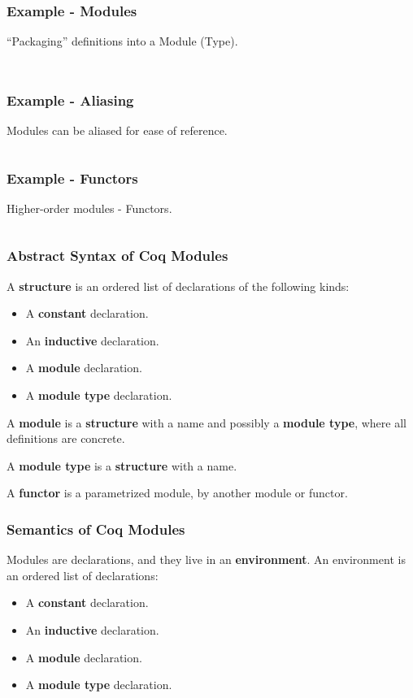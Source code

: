 \begin{frame}
  \frametitle{Example - Modules}
  ``Packaging'' definitions into a Module (Type).
  \inputminted[firstline=11,lastline=16]{coq}{code/module_example.v}
  \inputminted[firstline=19,lastline=23]{coq}{code/module_example.v}
\end{frame}

\begin{frame}
  \frametitle{Example - Aliasing}
  Modules can be aliased for ease of reference.
  \inputminted[firstline=24,lastline=25]{coq}{code/module_example.v}
\end{frame}

\begin{frame}
  \frametitle{Example - Functors}
  Higher-order modules - Functors.
  \inputminted[firstline=27]{coq}{code/module_example.v}
\end{frame}

\begin{frame}
  \frametitle{Abstract Syntax of Coq Modules}
  A \textbf{structure} is an ordered list of declarations of the following
  kinds:
  \begin{itemize}
    \item A \textbf{constant} declaration.
    \item An \textbf{inductive} declaration.
    \item A \textbf{module} declaration.
    \item A \textbf{module type} declaration.
  \end{itemize}\pause
  A \textbf{module} is a \textbf{structure} with a name and possibly a
  \textbf{module type}, where all definitions are concrete.\pause
  
  A \textbf{module type} is a \textbf{structure} with a name.\pause

  A \textbf{functor} is a parametrized module, by another module or functor.
\end{frame}

\begin{frame}
  \frametitle{Semantics of Coq Modules}
  Modules are declarations, and they live in an \textbf{environment}. An
  environment is an ordered list of declarations:
  \begin{itemize}
    \item A \textbf{constant} declaration.
    \item An \textbf{inductive} declaration.
    \item A \textbf{module} declaration.
    \item A \textbf{module type} declaration.
  \end{itemize}
\end{frame}


